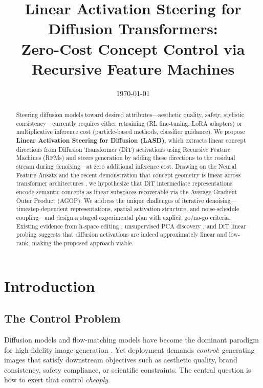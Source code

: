 \documentclass[11pt]{article}
\title{Linear Activation Steering for Diffusion Transformers:\\Zero-Cost Concept Control via Recursive Feature Machines}
\author{}
\date{\today}
\begin{document}
\maketitle

\begin{abstract}
Steering diffusion models toward desired attributes---aesthetic quality, safety, stylistic consistency---currently requires either retraining (RL fine-tuning, LoRA adapters) or multiplicative inference cost (particle-based methods, classifier guidance).
We propose \textbf{Linear Activation Steering for Diffusion (LASD)}, which extracts linear concept directions from Diffusion Transformer (DiT) activations using Recursive Feature Machines (RFMs) and steers generation by adding these directions to the residual stream during denoising---at zero additional inference cost.
Drawing on the Neural Feature Ansatz \citep{radhakrishnan2024mechanism} and the recent demonstration that concept geometry is linear across transformer architectures \citep{beaglehole2026universal}, we hypothesize that DiT intermediate representations encode semantic concepts as linear subspaces recoverable via the Average Gradient Outer Product (AGOP).
We address the unique challenges of iterative denoising---timestep-dependent representations, spatial activation structure, and noise-schedule coupling---and design a staged experimental plan with explicit go/no-go criteria.
Existing evidence from h-space editing \citep{kwon2023diffusion}, unsupervised PCA discovery \citep{haas2023discovering}, and DiT linear probing \citep{conceptattention2025} suggests that diffusion activations are indeed approximately linear and low-rank, making the proposed approach viable.
\end{abstract}

\tableofcontents
\newpage

\section{Introduction}
\label{sec:intro}

\subsection{The Control Problem}

Diffusion models and flow-matching models have become the dominant paradigm for high-fidelity image generation \citep{ho2020denoising,song2021scorebased,lipman2023flow}.
Yet deployment demands \emph{control}: generating images that satisfy downstream objectives such as aesthetic quality, brand consistency, safety compliance, or scientific constraints.
The central question is how to exert that control \emph{cheaply}.
\end{document}
